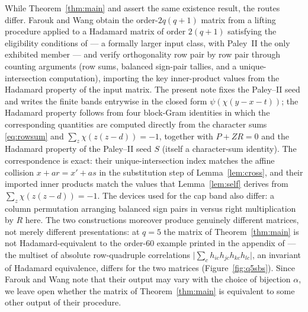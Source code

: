 \documentclass[11pt]{article}
\begin{document}
While Theorem~\ref{thm:main} and \cite[Cor.~2.1]{FaroukWang2020} assert
the same existence result, the routes differ.  Farouk and Wang obtain
the order-\(2q(q+1)\) matrix from a lifting procedure applied to a
Hadamard matrix of order \(2(q+1)\) satisfying the eligibility
conditions of \cite[Lem.~2.2]{FaroukWang2020} --- a formally larger
input class, with Paley~II the only exhibited member --- and verify
orthogonality row pair by row pair through counting arguments (row
sums, balanced sign-pair tallies, and a unique-intersection
computation), importing the key inner-product values from the Hadamard
property of the input matrix.  The present note fixes the Paley--II
seed and writes the finite bands entrywise in the closed form
\(\psi(\chi(y-x-t))\); the Hadamard property follows from four
block-Gram identities in which the corresponding quantities are
computed directly from the character sums \eqref{eq:rowsum} and
\(\sum_{z}\chi(z(z-d))=-1\), together with \(P+ZR=0\) and the
Hadamard property of the Paley--II seed \(S\) (itself a
character-sum identity).  The
correspondence is exact: their unique-intersection index matches the
affine collision \(x+ar=x'+as\) in the substitution step of
Lemma~\ref{lem:cross}, and their imported inner products match the
values that Lemma~\ref{lem:self} derives from
\(\sum_{z}\chi(z(z-d))=-1\).  The devices used for the cap band also
differ: a column permutation arranging balanced sign pairs in
\cite{FaroukWang2020} versus right multiplication by \(R\) here.  The
two constructions moreover produce genuinely different matrices, not
merely different presentations: at \(q=5\) the matrix of
Theorem~\ref{thm:main} is not Hadamard-equivalent to the order-\(60\)
example printed in the appendix of \cite{FaroukWang2020} --- the
multiset of absolute row-quadruple correlations
\(\bigl|\sum_{c}h_{ic}h_{jc}h_{kc}h_{lc}\bigr|\), an invariant of
Hadamard equivalence, differs for the two matrices
(Figure~\ref{fig:q5sbs}).  Since Farouk and
Wang note that their output may vary with the choice of bijection
\(\alpha\), we leave open whether the matrix of
Theorem~\ref{thm:main} is equivalent to some other output of their
procedure.
\end{document}
